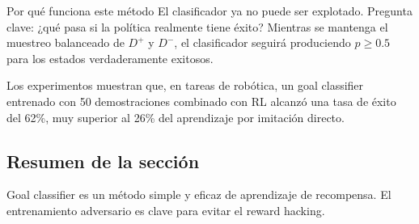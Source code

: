 \begin{knowledgebox}{Por qué funciona este método}
El clasificador ya no puede ser explotado. Pregunta clave: ¿qué pasa si la política realmente tiene éxito? Mientras se mantenga el muestreo balanceado de $D^+$ y $D^-$, el clasificador seguirá produciendo $p \geq 0.5$ para los estados verdaderamente exitosos.
\end{knowledgebox}

Los experimentos muestran que, en tareas de robótica, un goal classifier entrenado con 50 demostraciones combinado con RL alcanzó una tasa de éxito del 62\%, muy superior al 26\% del aprendizaje por imitación directo.

\subsection{Resumen de la sección}

Goal classifier es un método simple y eficaz de aprendizaje de recompensa. El entrenamiento adversario es clave para evitar el reward hacking.
